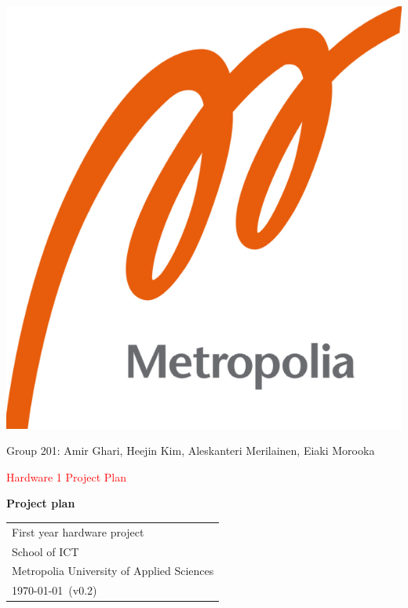 \documentclass{article}
\begin{document}
\begin{center}
\includegraphics[scale=0.2]{logo.png}
\end{center}

\vspace{0.5cm}

\begin{center}

 Group 201: Amir Ghari, Heejin Kim, Aleskanteri Merilainen, Eiaki Morooka \\

\vspace{0.5cm}

{\Huge \textcolor{red}{Hardware 1 Project Plan}} \\


\vspace{0.5cm}

{\Large \textbf{Project plan}} \\


\end{center}

\vspace{1cm}

\begin{center}

{\Large }



\begin{tabular}{l}
 First year hardware project \\
 School of ICT\\
 Metropolia University of Applied Sciences  \\
 \today \, (v0.2)
\end{tabular}
\end{center}
\end{document}
